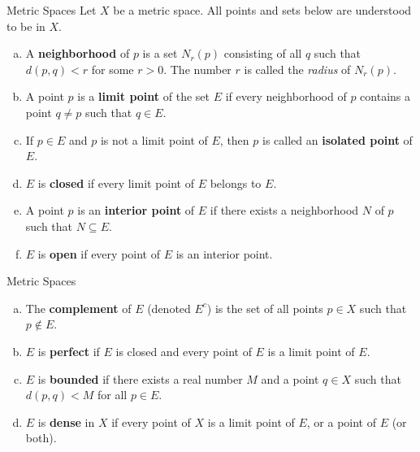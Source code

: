 \documentclass{beamer}
\begin{document}
\begin{frame}{Metric Spaces}
 Let $X$ be a metric space. All points and sets below are understood to be in
 $X$.


\begin{enumerate}[(a)]
    \item A \textbf{neighborhood} of $p$ is a set $N_r(p)$ consisting of all $q$
    such that $d(p,q) < r$ for some $r > 0$. The number $r$ is called the
    \emph{radius} of $N_r(p)$.

    \item A point $p$ is a \textbf{limit point} of the set $E$ if every
    neighborhood of $p$ contains a point $q \neq p$ such that $q \in E$.

    \item If $p \in E$ and $p$ is not a limit point of $E$, then $p$ is called
    an \textbf{isolated point} of $E$.

    \item $E$ is \textbf{closed} if every limit point of $E$ belongs to $E$.

    \item A point $p$ is an \textbf{interior point} of $E$ if there exists a
    neighborhood $N$ of $p$ such that $N \subseteq E$.

    \item $E$ is \textbf{open} if every point of $E$ is an interior point.
\end{enumerate}
\end{frame}
\begin{frame}{Metric Spaces}
\begin{enumerate}[(a)]
    \item The \textbf{complement} of $E$ (denoted $E^c$) is the set of all
    points $p \in X$ such that $p \notin E$.

    \item $E$ is \textbf{perfect} if $E$ is closed and every point of $E$ is a
    limit point of $E$.

    \item $E$ is \textbf{bounded} if there exists a real number $M$ and a point
    $q \in X$ such that $d(p,q) < M$ for all $p \in E$.

    \item $E$ is \textbf{dense} in $X$ if every point of $X$ is a limit point of
    $E$, or a point of $E$ (or both).
\end{enumerate}





\end{frame}
\end{document}
